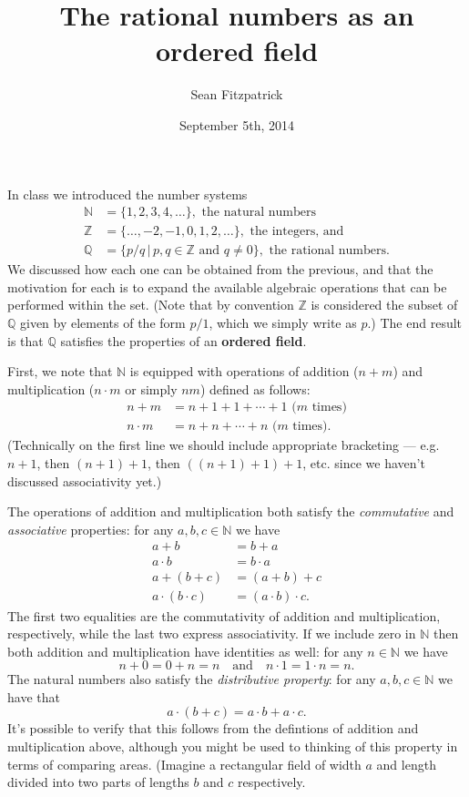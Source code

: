 \documentclass[letterpaper,12pt]{article}
\title{The rational numbers as an ordered field}
\author{Sean Fitzpatrick}
\date{September 5th, 2014}
\newcommand{\N}{\mathbb{N}}
\newcommand{\Z}{\mathbb{Z}}
\newcommand{\Q}{\mathbb{Q}}
\begin{document}
 \maketitle

In class we introduced the number systems
\begin{align*}
 \N & = \{1,2,3,4,\ldots\}, \text{ the natural numbers}\\
 \Z & = \{\ldots, -2, -1, 0, 1, 2,\ldots\}, \text{ the integers, and}\\
 \Q & = \{p/q\,|\, p,q\in\Z \text{ and } q\neq 0\}, \text{ the rational numbers.}
\end{align*}
We discussed how each one can be obtained from the previous, and that the motivation for each is to expand the available algebraic operations that can be performed within the set. (Note that by convention $\Z$ is considered the subset of $\Q$ given by elements of the form $p/1$, which we simply write as $p$.) The end result is that $\Q$ satisfies the properties of an {\bf ordered field}.

First, we note that $\N$ is equipped with operations of addition ($n+m$) and multiplication ($n\cdot m$ or simply $nm$) defined as follows:
\begin{align*}
 n+m & = n+1+1+\cdots +1 \text{ ($m$ times)}\\
 n\cdot m & = n + n + \cdots + n \text{ ($m$ times)}.
\end{align*}
(Technically on the first line we should include appropriate bracketing --- e.g. $n+1$, then $(n+1)+1$, then $((n+1)+1)+1$, etc. since we haven't discussed associativity yet.)

The operations of addition and multiplication both satisfy the {\em commutative} and {\em associative} properties: for any $a,b,c\in \N$ we have
\begin{align*}
 a+b & = b+a\\
 a\cdot b & = b\cdot a\\
 a+(b+c) & = (a+b)+c\\
 a\cdot(b\cdot c) & = (a\cdot b)\cdot c.
\end{align*}
The first two equalities are the commutativity of addition and multiplication, respectively, while the last two express associativity. If we include zero in $\N$ then both addition and multiplication have identities as well: for any $n\in\N$ we have
\[
 n+0=0+n=n \quad \text{and}\quad n\cdot 1=1\cdot n = n.
\]
The natural numbers also satisfy the {\em distributive property}: for any $a,b,c\in \N$ we have that
\[
 a\cdot(b+c) = a\cdot b+a\cdot c.
\]
It's possible to verify that this follows from the defintions of addition and multiplication above, although you might be used to thinking of this property in terms of comparing areas. (Imagine a rectangular field of width $a$ and length divided into two parts of lengths $b$ and $c$ respectively.
\end{document}
